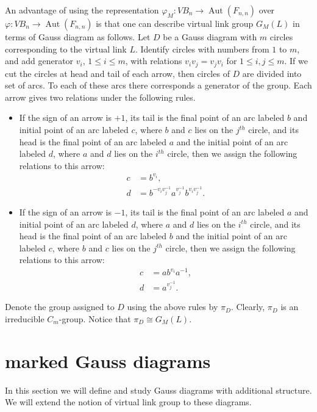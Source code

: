 \documentclass[11 pt, reqno]{amsart}
\theoremstyle{definition}
\numberwithin{equation}{subsection}
\newcommand{\Aut}{\operatorname{Aut}}
\begin{document}
An advantage of using the representation $\varphi_M:VB_n \to \Aut(F_{n,n})$ over $\varphi: VB_n \to \Aut(F_{n,n})$ is that one can describe virtual link group $G_M(L)$ in terms of \textrm{Gauss diagram} as follows. Let $D$ be a Gauss diagram with $m$ circles corresponding to the virtual link $L$. Identify circles with numbers from $1$ to $m$, and add generator $v_i$, $1 \leq i \leq m$, with relations $v_i v_j =v_j v_i$ for $1 \leq i, j \leq m$. If we cut the circles at head and tail of each arrow, then circles of $D$ are divided into set of arcs. To each of these arcs there corresponds a generator of the group. Each arrow gives two relations under the following rules.
\begin{itemize}
\item If the sign of an arrow is $+1$, its tail is the final point of an arc labeled $b$ and initial point of an arc labeled $c$, where $b$ and $c$ lies on the $j^{th}$ circle, and its head is the final point of an arc labeled $a$ and the initial point of an arc labeled $d$, where $a$ and $d$ lies on the $i^{th}$ circle, then we assign the following relations to this arrow:
\begin{align*}
c&=b^{v_i},\\
d&=b^{-v_i v_j ^{-1}} a^{v_j ^{-1}} b ^{v_i v_j ^{-1}}.
\end{align*}
\item If the sign of an arrow is $-1$, its tail is the final point of an arc labeled $a$ and initial point of an arc labeled $d$, where $a$ and $d$ lies on the $i^{th}$ circle, and its head is the final point of an arc labeled $b$ and the initial point of an arc labeled $c$, where $b$ and $c$ lies on the $j^{th}$ circle, then we assign the following relations to this arrow:
\begin{align*}
c&=a b ^{v_i} a^{-1},\\
d&=a^{v_j^{-1}}.
\end{align*}
\end{itemize}
Denote the group assigned to $D$ using the above rules by $\pi_D$. Clearly, $\pi_D$ is an irreducible $C_m$-group. 
Notice that $\pi_D \cong G_M(L)$.


\medskip


\section{marked Gauss diagrams}\label{S: marked Gauss Diagrams}

In this section we will define and study Gauss diagrams with additional structure. We will extend the notion of virtual link group to these diagrams. 
\end{document}
